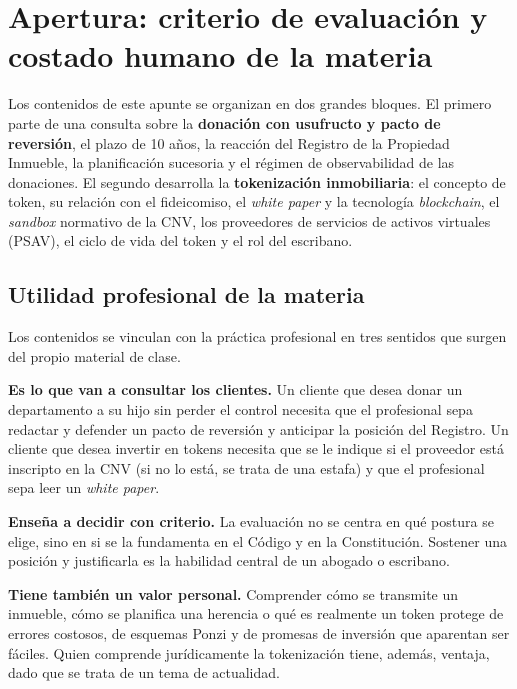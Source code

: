 \documentclass[12pt,oneside]{book}
\begin{document}
\chapter[Criterio de evaluación y empresa familiar]{Apertura: criterio de evaluación y costado humano de la materia}

Los contenidos de este apunte se organizan en dos grandes bloques. El primero parte de una consulta sobre la \textbf{donación con usufructo y pacto de reversión}, el plazo de 10 años, la reacción del Registro de la Propiedad Inmueble, la planificación sucesoria y el régimen de observabilidad de las donaciones. El segundo desarrolla la \textbf{tokenización inmobiliaria}: el concepto de token, su relación con el fideicomiso, el \textit{white paper} y la tecnología \textit{blockchain}, el \textit{sandbox} normativo de la CNV, los proveedores de servicios de activos virtuales (PSAV), el ciclo de vida del token y el rol del escribano.

\section{Utilidad profesional de la materia}

Los contenidos se vinculan con la práctica profesional en tres sentidos que surgen del propio material de clase.

\textbf{Es lo que van a consultar los clientes.} Un cliente que desea donar un departamento a su hijo sin perder el control necesita que el profesional sepa redactar y defender un pacto de reversión y anticipar la posición del Registro. Un cliente que desea invertir en tokens necesita que se le indique si el proveedor está inscripto en la CNV (si no lo está, se trata de una estafa) y que el profesional sepa leer un \textit{white paper}.

\textbf{Enseña a decidir con criterio.} La evaluación no se centra en qué postura se elige, sino en si se la fundamenta en el Código y en la Constitución. Sostener una posición y justificarla es la habilidad central de un abogado o escribano.

\textbf{Tiene también un valor personal.} Comprender cómo se transmite un inmueble, cómo se planifica una herencia o qué es realmente un token protege de errores costosos, de esquemas Ponzi y de promesas de inversión que aparentan ser fáciles. Quien comprende jurídicamente la tokenización tiene, además, ventaja, dado que se trata de un tema de actualidad.
\end{document}
